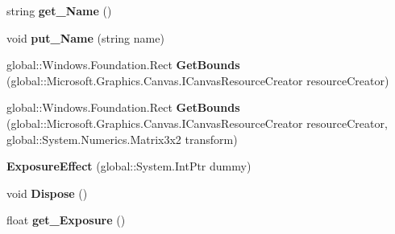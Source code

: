 \begin{DoxyCompactItemize}
string {\bfseries get\+\_\+\+Name} ()
\item 
\mbox{\label{class_microsoft_1_1_graphics_1_1_canvas_1_1_effects_1_1_exposure_effect_a08d222c7d3bda4ff7600028c76094a78}} 
void {\bfseries put\+\_\+\+Name} (string name)
\item 
\mbox{\label{class_microsoft_1_1_graphics_1_1_canvas_1_1_effects_1_1_exposure_effect_a1270050e057b25ed336629d9dbbe3c97}} 
global\+::\+Windows.\+Foundation.\+Rect {\bfseries Get\+Bounds} (global\+::\+Microsoft.\+Graphics.\+Canvas.\+I\+Canvas\+Resource\+Creator resource\+Creator)
\item 
\mbox{\label{class_microsoft_1_1_graphics_1_1_canvas_1_1_effects_1_1_exposure_effect_a0c2998bcc281563540602e5cd9876e4c}} 
global\+::\+Windows.\+Foundation.\+Rect {\bfseries Get\+Bounds} (global\+::\+Microsoft.\+Graphics.\+Canvas.\+I\+Canvas\+Resource\+Creator resource\+Creator, global\+::\+System.\+Numerics.\+Matrix3x2 transform)
\item 
\mbox{\label{class_microsoft_1_1_graphics_1_1_canvas_1_1_effects_1_1_exposure_effect_a71b4e6e4d796061fbe70e8dbafa96676}} 
{\bfseries Exposure\+Effect} (global\+::\+System.\+Int\+Ptr dummy)
\item 
\mbox{\label{class_microsoft_1_1_graphics_1_1_canvas_1_1_effects_1_1_exposure_effect_a073502db74a16a0bc3b88fd3e0feee8a}} 
void {\bfseries Dispose} ()
\item 
\mbox{\label{class_microsoft_1_1_graphics_1_1_canvas_1_1_effects_1_1_exposure_effect_a21127a47d22be5f3657dce651488a984}} 
float {\bfseries get\+\_\+\+Exposure} ()
\item 
\mbox{\label{class_microsoft_1_1_graphics_1_1_canvas_1_1_effects_1_1_exposure_effect_ae2886e4afaf9fb5cc87189bfa0b30600}} 

\end{DoxyCompactItemize}
